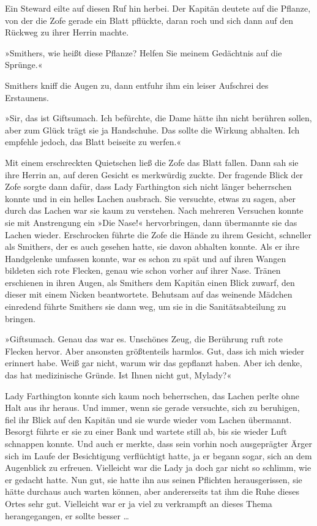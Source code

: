 Ein Steward eilte auf diesen Ruf hin herbei. Der Kapitän deutete
auf die Pflanze, von der die Zofe gerade ein Blatt pflückte, daran
roch und sich dann auf den Rückweg zu ihrer Herrin machte.

»Smithers, wie heißt diese Pflanze? Helfen Sie meinem Gedächtnis
auf die Sprünge.«

Smithers kniff die Augen zu, dann entfuhr ihm ein leiser Aufschrei
des Erstaunens.

»Sir, das ist Giftsumach. Ich befürchte, die Dame hätte ihn nicht
berühren sollen, aber zum Glück trägt sie ja Handschuhe. Das sollte
die Wirkung abhalten. Ich empfehle jedoch, das Blatt beiseite zu
werfen.«

Mit einem erschreckten Quietschen ließ die Zofe das Blatt fallen.
Dann sah sie ihre Herrin an, auf deren Gesicht es merkwürdig
zuckte. Der fragende Blick der Zofe sorgte dann dafür, dass Lady
Farthington sich nicht länger beherrschen konnte und in ein helles
Lachen ausbrach. Sie versuchte, etwas zu sagen, aber durch das
Lachen war sie kaum zu verstehen. Nach mehreren Versuchen konnte
sie mit Anstrengung ein »Die Nase!« hervorbringen, dann übermannte
sie das Lachen wieder. Erschrocken führte die Zofe die Hände zu
ihrem Gesicht, schneller als Smithers, der es auch gesehen hatte,
sie davon abhalten konnte. Als er ihre Handgelenke umfassen konnte,
war es schon zu spät und auf ihren Wangen bildeten sich rote
Flecken, genau wie schon vorher auf ihrer Nase. Tränen erschienen
in ihren Augen, als Smithers dem Kapitän einen Blick zuwarf, den
dieser mit einem Nicken beantwortete. Behutsam auf das weinende
Mädchen einredend führte Smithers sie dann weg, um sie in die
Sanitätsabteilung zu bringen.

\bigpar

»Giftsumach. Genau das war es. Unschönes Zeug, die Berührung ruft
rote Flecken hervor. Aber ansonsten größtenteils harmlos. Gut, dass
ich mich wieder erinnert habe. Weiß gar nicht, warum wir das
gepflanzt haben. Aber ich denke, das hat medizinische Gründe. Ist
Ihnen nicht gut, Mylady?«

Lady Farthington konnte sich kaum noch beherrschen, das Lachen
perlte ohne Halt aus ihr heraus. Und immer, wenn sie gerade
versuchte, sich zu beruhigen, fiel ihr Blick auf den Kapitän und
sie wurde wieder vom Lachen übermannt. Besorgt führte er sie zu
einer Bank und wartete still ab, bis sie wieder Luft schnappen
konnte. Und auch er merkte, dass sein vorhin noch ausgeprägter
Ärger sich im Laufe der Besichtigung verflüchtigt hatte, ja er
begann sogar, sich an dem Augenblick zu erfreuen. Vielleicht war
die Lady ja doch gar nicht so schlimm, wie er gedacht hatte. Nun
gut, sie hatte ihn aus seinen Pflichten herausgerissen, sie hätte
durchaus auch warten können, aber andererseits tat ihm die Ruhe
dieses Ortes sehr gut. Vielleicht war er ja viel zu verkrampft an
dieses Thema herangegangen, er sollte besser …

